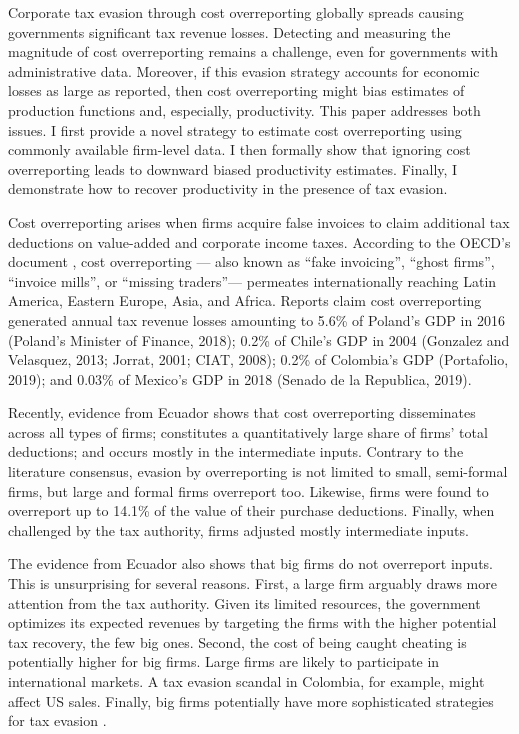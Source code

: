 \documentclass[
  12pt]{article}
\theoremstyle{definition}
\theoremstyle{remark}
\begin{document}
Corporate tax evasion through cost overreporting globally spreads
causing governments significant tax revenue losses. Detecting and
measuring the magnitude of cost overreporting remains a challenge, even
for governments with administrative data. Moreover, if this evasion
strategy accounts for economic losses as large as reported, then cost
overreporting might bias estimates of production functions and,
especially, productivity. This paper addresses both issues. I first
provide a novel strategy to estimate cost overreporting using commonly
available firm-level data. I then formally show that ignoring cost
overreporting leads to downward biased productivity estimates. Finally,
I demonstrate how to recover productivity in the presence of tax
evasion.

Cost overreporting arises when firms acquire false invoices to claim
additional tax deductions on value-added and corporate income taxes.
According to the OECD's document \citet{OECD2017}, cost overreporting
--- also known as ``fake invoicing'', ``ghost firms'', ``invoice
mills'', or ``missing traders''--- permeates internationally reaching
Latin America, Eastern Europe, Asia, and Africa. Reports claim cost
overreporting generated annual tax revenue losses amounting to 5.6\% of
Poland's GDP in 2016 (Poland's Minister of Finance, 2018); 0.2\% of
Chile's GDP in 2004 (Gonzalez and Velasquez, 2013; Jorrat, 2001; CIAT,
2008); 0.2\% of Colombia's GDP (Portafolio, 2019); and 0.03\% of
Mexico's GDP in 2018 (Senado de la Republica, 2019).

Recently, evidence from Ecuador \citep{Carrillo2022} shows that cost
overreporting disseminates across all types of firms; constitutes a
quantitatively large share of firms' total deductions; and occurs mostly
in the intermediate inputs. Contrary to the literature consensus,
evasion by overreporting is not limited to small, semi-formal firms, but
large and formal firms overreport too. Likewise, firms were found to
overreport up to 14.1\% of the value of their purchase deductions.
Finally, when challenged by the tax authority, firms adjusted mostly
intermediate inputs.

The evidence from Ecuador also shows that big firms do not overreport
inputs. This is unsurprising for several reasons. First, a large firm
arguably draws more attention from the tax authority. Given its limited
resources, the government optimizes its expected revenues by targeting
the firms with the higher potential tax recovery, the few big ones.
Second, the cost of being caught cheating is potentially higher for big
firms. Large firms are likely to participate in international markets. A
tax evasion scandal in Colombia, for example, might affect US sales.
Finally, big firms potentially have more sophisticated strategies for
tax evasion \citep[e.g., profit shifting][]{Bustos2022}.
\end{document}
